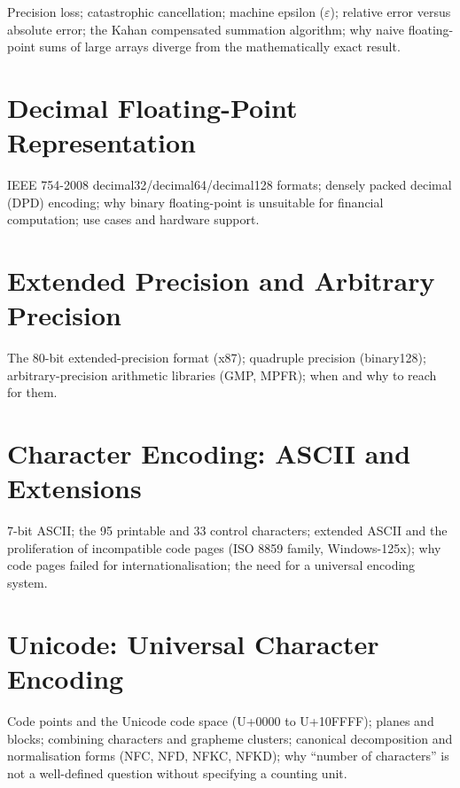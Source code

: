 Precision loss; catastrophic cancellation; machine epsilon ($\varepsilon$);
relative error versus absolute error; the Kahan compensated summation
algorithm; why naive floating-point sums of large arrays diverge from the
mathematically exact result.

\chapter{Decimal Floating-Point Representation}
\label{ch:decimal-float}

IEEE 754-2008 decimal32/decimal64/decimal128 formats; densely packed decimal
(DPD) encoding; why binary floating-point is unsuitable for financial
computation; use cases and hardware support.

\chapter{Extended Precision and Arbitrary Precision}
\label{ch:extended-precision}

The 80-bit extended-precision format (x87); quadruple precision (binary128);
arbitrary-precision arithmetic libraries (GMP, MPFR); when and why to reach
for them.



\chapter{Character Encoding: ASCII and Extensions}
\label{ch:ascii}

7-bit ASCII; the 95 printable and 33 control characters; extended ASCII and
the proliferation of incompatible code pages (ISO 8859 family,
Windows-125x); why code pages failed for internationalisation; the need for
a universal encoding system.

\chapter{Unicode: Universal Character Encoding}
\label{ch:unicode}

Code points and the Unicode code space (U+0000 to U+10FFFF); planes and
blocks; combining characters and grapheme clusters; canonical decomposition
and normalisation forms (NFC, NFD, NFKC, NFKD); why ``number of
characters'' is not a well-defined question without specifying a counting
unit.

